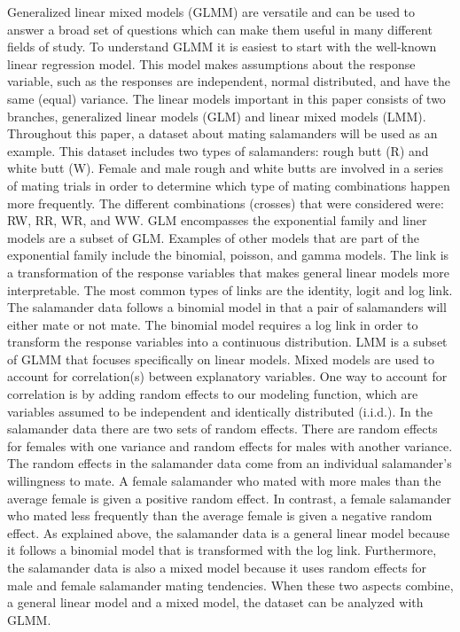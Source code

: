 \documentclass{article}
\begin{document}
    Generalized linear mixed models (GLMM) are versatile and can be used to answer a broad set of questions which can make them useful in many different fields of study.  To understand GLMM it is easiest to start with the well-known linear regression model.  This model makes assumptions about the response variable, such as the responses are independent, normal distributed, and have the same (equal) variance.  The linear models important in this paper consists of two branches, generalized linear models (GLM) and linear mixed models (LMM). 
	Throughout this paper, a dataset about mating salamanders will be used as an example.  This dataset includes two types of salamanders: rough butt (R) and white butt (W).  Female and male rough and white butts are involved in a series of mating trials in order to determine which type of mating combinations happen more frequently.  The different combinations (crosses) that were considered were: RW, RR, WR, and WW.
	GLM encompasses the exponential family and liner models are a subset of GLM.  Examples of other models that are part of the exponential family include the binomial, poisson, and gamma models.  The link is a transformation of the response variables that makes general linear models more interpretable.  The most common types of links are the identity, logit and log link.  The salamander data follows a binomial model in that a pair of salamanders will either mate or not mate.  The binomial model requires a log link in order to transform the response variables into a continuous distribution.
	LMM is a subset of GLMM that focuses specifically on linear models.  Mixed models are used to account for correlation(s) between explanatory variables.  One way to account for correlation is by adding random effects to our modeling function, which are variables assumed to be independent and identically distributed (i.i.d.).  In the salamander data there are two sets of random effects.  There are random effects for females with one variance and random effects for males with another variance.  The random effects in the salamander data come from an individual salamander’s willingness to mate.  A female salamander who mated with more males than the average female is given a positive random effect.  In contrast, a female salamander who mated less frequently than the average female is given a negative random effect. 
	As explained above, the salamander data is a general linear model because it follows a binomial model that is transformed with the log link.  Furthermore, the salamander data is also a mixed model because it uses random effects for male and female salamander mating tendencies.  When these two aspects combine, a general linear model and a mixed model, the dataset can be analyzed with GLMM. 



\end{document}
